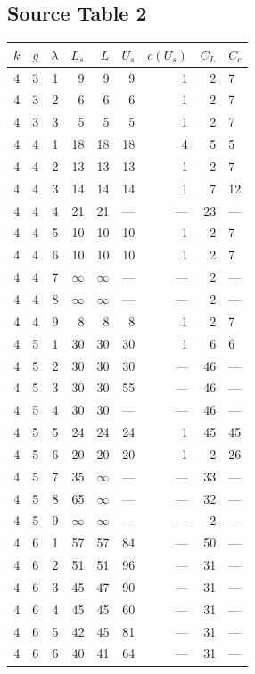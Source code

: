 \subsection*{Source Table 2}
\begin{longtable}{rrrrrrrrl}
\toprule $k$ & $g$ & $\lambda$ & $L_s$ & $L$ & $U_s$ & $c(U_s)$ & $C_L$ & $C_c$ \\ \midrule\endhead
4 & 3 & 1 & 9 & 9 & 9 & 1 & 2 & 7 \\
4 & 3 & 2 & 6 & 6 & 6 & 1 & 2 & 7 \\
4 & 3 & 3 & 5 & 5 & 5 & 1 & 2 & 7 \\
4 & 4 & 1 & 18 & 18 & 18 & 4 & 5 & 5 \\
4 & 4 & 2 & 13 & 13 & 13 & 1 & 2 & 7 \\
4 & 4 & 3 & 14 & 14 & 14 & 1 & 7 & 12 \\
4 & 4 & 4 & 21 & 21 & --- & --- & 23 & --- \\
4 & 4 & 5 & 10 & 10 & 10 & 1 & 2 & 7 \\
4 & 4 & 6 & 10 & 10 & 10 & 1 & 2 & 7 \\
4 & 4 & 7 & $\infty$ & $\infty$ & --- & --- & 2 & --- \\
4 & 4 & 8 & $\infty$ & $\infty$ & --- & --- & 2 & --- \\
4 & 4 & 9 & 8 & 8 & 8 & 1 & 2 & 7 \\
4 & 5 & 1 & 30 & 30 & 30 & 1 & 6 & 6 \\
4 & 5 & 2 & 30 & 30 & 30 & --- & 46 & --- \\
4 & 5 & 3 & 30 & 30 & 55 & --- & 46 & --- \\
4 & 5 & 4 & 30 & 30 & --- & --- & 46 & --- \\
4 & 5 & 5 & 24 & 24 & 24 & 1 & 45 & 45 \\
4 & 5 & 6 & 20 & 20 & 20 & 1 & 2 & 26 \\
4 & 5 & 7 & 35 & $\infty$ & --- & --- & 33 & --- \\
4 & 5 & 8 & 65 & $\infty$ & --- & --- & 32 & --- \\
4 & 5 & 9 & $\infty$ & $\infty$ & --- & --- & 2 & --- \\
4 & 6 & 1 & 57 & 57 & 84 & --- & 50 & --- \\
4 & 6 & 2 & 51 & 51 & 96 & --- & 31 & --- \\
4 & 6 & 3 & 45 & 47 & 90 & --- & 31 & --- \\
4 & 6 & 4 & 45 & 45 & 60 & --- & 31 & --- \\
4 & 6 & 5 & 42 & 45 & 81 & --- & 31 & --- \\
4 & 6 & 6 & 40 & 41 & 64 & --- & 31 & --- \\

\end{longtable}
